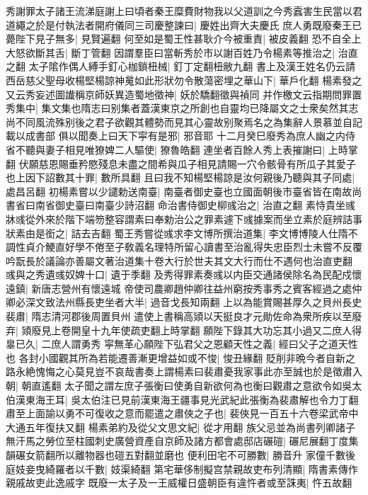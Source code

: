秀謝罪太子諸王流涕庭謝上曰頃者秦王糜費財物我以父道訓之今秀蠧害生民當以君道繩之於是付執法者開府儀同三司慶整諫曰|{
	慶姓出齊大夫慶氏}
庶人勇既廢秦王已薨陛下見子無多|{
	見賢遍翻}
何至如是蜀王性甚耿介今被重責|{
	被皮義翻}
恐不自全上大怒欲斷其舌|{
	斷丁管翻}
因謂羣臣曰當斬秀於市以謝百姓乃令楊素等推治之|{
	治直之翻}
太子隂作偶人縛手釘心枷鎖杻械|{
	釘丁定翻杻敝九翻}
書上及漢王姓名仍云請西岳慈父聖母收楊堅楊諒神䰟如此形狀勿令散蕩密埋之華山下|{
	華戶化翻}
楊素發之又云秀妄述圖䜟稱京師妖異造蜀地徵神|{
	妖於驕翻徵與禎同}
并作檄文云指期問罪置秀集中|{
	集文集也隋志曰别集者蓋漢東京之所創也自靈均已降屬文之士衆矣然其志尚不同風流殊别後之君子欲觀其體勢而見其心靈故别聚焉名之為集辭人景慕並自記載以成書部}
俱以聞奏上曰天下寜有是邪|{
	邪音耶}
十二月癸巳廢秀為庶人幽之内侍省不聽與妻子相見唯獠婢二人驅使|{
	獠魯皓翻}
連坐者百餘人秀上表摧謝曰|{
	上時掌翻}
伏願慈恩賜垂矜愍殘息未盡之間希與瓜子相見請賜一穴令骸骨有所瓜子其愛子也上因下詔數其十罪|{
	數所具翻}
且曰我不知楊堅楊諒是汝何親後乃聽與其子同處|{
	處昌呂翻}
初楊素嘗以少譴勅送南臺|{
	南臺者御史臺也立國面朝後市臺省皆在南故尚書省曰南省御史臺曰南臺少詩沼翻}
命治書侍御史柳彧治之|{
	治直之翻}
素恃貴坐彧牀彧從外來於階下端笏整容謂素曰奉勅治公之罪素遽下彧據案而坐立素於庭辨詰事狀素由是銜之|{
	詰去吉翻}
蜀王秀嘗從彧求李文博所撰治道集|{
	李文博博陵人仕隋不調性貞介鯁直好學不倦至子敎義名理特所留心讀書至治亂得失忠臣烈士未嘗不反覆吟翫長於議論亦善屬文著治道集十卷大行於世夫其文大行而仕不遇何也治直吏翻}
彧與之秀遺彧奴婢十口|{
	遺于季翻}
及秀得罪素奏彧以内臣交通諸侯除名為民配戍懷遠鎮|{
	新唐志營州有懷遠城}
帝使司農卿趙仲卿往益州窮按秀事秀之賓客經過之處仲卿必深文致法州縣長吏坐者大半|{
	過音戈長知兩翻}
上以為能賞賜甚厚久之貝州長史裴肅|{
	隋志清河郡後周置貝州}
遣使上書稱高熲以天挺良才元勛佐命為衆所疾以至廢弃|{
	熲廢見上卷開皇十九年使疏吏翻上時掌翻}
願陛下錄其大功忘其小過又二庶人得辠已久|{
	二庶人謂勇秀}
寜無革心願陛下弘君父之恩顧天性之義|{
	經曰父子之道天性也}
各封小國觀其所為若能遷善漸更增益如或不悛|{
	悛丑緣翻}
貶削非晩今者自新之路永絶愧悔之心莫見豈不哀哉書奏上謂楊素曰裴肅憂我家事此亦至誠也於是徵肅入朝|{
	朝直遙翻}
太子聞之謂左庶子張衡曰使勇自新欲何為也衡曰觀肅之意欲令如吳太伯漢東海王耳|{
	吳太伯注已見前漢東海王疆事見光武紀此張衡為裴肅解也令力丁翻}
肅至上面諭以勇不可復收之意而罷遣之肅俠之子也|{
	裴俠見一百五十六卷梁武帝中大通五年復扶又翻}
楊素弟約及從父文思文紀|{
	從才用翻}
族父忌並為尚書列卿諸子無汗馬之勞位至柱國刺史廣營資產自京師及諸方都會處邸店碾磑|{
	碾尼展翻丁度集韻碾女箭翻所以離物器也磑五對翻並磨也}
便利田宅不可勝數|{
	勝音升}
家僮千數後庭妓妾曳綺羅者以千數|{
	妓渠綺翻}
第宅華侈制擬宫禁親故吏布列清顯|{
	隋書素傳作親戚故吏此逸戚字}
既廢一太子及一王威權日盛朝臣有違忤者或至誅夷|{
	忤五故翻}
